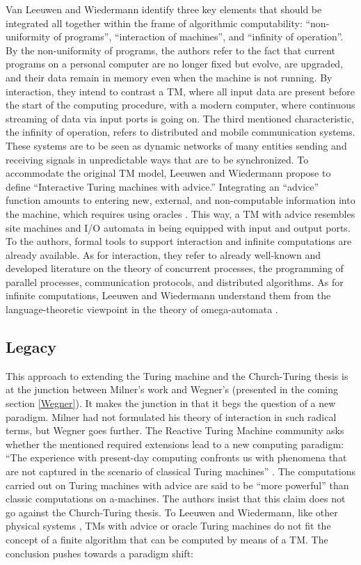\documentclass[a4paper, 11pt, twoside]{article}
\begin{document}
Van Leeuwen and Wiedermann identify three key elements that should be integrated all together within the frame of algorithmic computability: ``non-uniformity of programs'', ``interaction of machines'', and ``infinity of operation''. By the non-uniformity of programs, the authors refer to the fact that current programs on a personal computer are no longer fixed but evolve, are upgraded, and their data remain in memory even when the machine is not running. By interaction, they intend to contrast a TM, where all input data are present before the start of the computing procedure, with a modern computer, where continuous streaming of data via input ports is going on. The third mentioned characteristic, the infinity of operation, refers to distributed and mobile communication systems. These systems are to be seen as dynamic networks of many entities sending and receiving signals in unpredictable ways that are to be synchronized. To accommodate the original TM model, Leeuwen and Wiedermann propose to define ``Interactive Turing machines with advice.'' Integrating an ``advice'' function amounts to entering new, external, and non-computable information into the machine, which requires using oracles \parencite{Balcazar1995, Rogers1987}. 
This way, a TM with advice resembles site machines and I/O automata in being equipped with input and output ports. To the authors, formal tools to support interaction and infinite computations are already available. As for interaction, they refer to already well-known and developed literature on the theory of concurrent processes, the programming of parallel processes, communication protocols, and distributed algorithms. As for infinite computations, Leeuwen and Wiedermann understand them from the language-theoretic viewpoint in the theory of omega-automata \parencite{Staiger1997, Thomas1990}.

\subsection{Legacy}

This approach to extending the Turing machine and the Church-Turing thesis is at the junction between Milner's work and Wegner's (presented in the coming section \ref{Wegner}). It makes the junction in that it begs the question of a new paradigm. Milner had not formulated his theory of interaction in such radical terms, but Wegner goes further. The Reactive Turing Machine community asks whether the mentioned required extensions lead to a new computing paradigm: ``The experience with present-day computing confronts us with phenomena that are not captured in the scenario of classical Turing machines'' \parencite{VanLeeuwen2001}. The computations carried out on Turing machines with advice are said to be ``more powerful'' than classic computations on a-machines. The authors insist that this claim does not go against the Church-Turing thesis. To Leeuwen and Wiedermann, like other physical systems \parencite{Pour-El1999}, TMs with advice or oracle Turing machines do not fit the concept of a finite algorithm that can be computed by means of a TM. The conclusion pushes towards a paradigm shift: 
\end{document}
